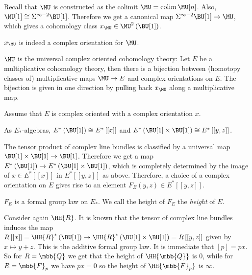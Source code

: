 \begin{example*}
	Recall that $\MU$ is constructed as the colimit $\MU = \colim \MU[n]$.
	Also, $\MU[1] \cong \Sigma^{\infty-2} \BU[1]$.
	Therefore we get a canonical map $\Sigma^{\infty-2} \BU[1] \to \MU$, which gives a cohomology class $x_{\MU} \in \MU^2\left(\BU[1]\right)$.
\end{example*}

\begin{proposition}
	$x_{\MU}$ is indeed a complex orientation for $\MU$.
\end{proposition}

\begin{theorem}
	$\MU$ is the universal complex oriented cohomology theory:
	Let $E$ be a multiplicative cohomology theory, then there is a bijection between (homotopy classes of) multiplicative maps $\MU \to E$ and complex orientations on $E$.
	The bijection is given in one direction by pulling back $x_{\MU}$ along a multiplicative map.
\end{theorem}

Assume that $E$ is complex oriented with a complex orientation $x$.

\begin{theorem}
	As $E_*$-algebras,
	$E^*\left(\BU[1]\right) \cong E^*\left[\left[x\right]\right]$
	and
	$E^*\left(\BU[1] \times \BU[1]\right) \cong E^*\left[\left[y,z\right]\right]$.
\end{theorem}

The tensor product of complex line bundles is classified by a universal map $\BU[1] \times \BU[1] \to \BU[1]$.
Therefore we get a map $E^*\left(\BU[1]\right) \to E^*\left(\BU[1] \times \BU[1]\right)$, which is completely determined by the image of $x \in E^*\left[\left[x\right]\right]$ in $E^*\left[\left[y,z\right]\right]$ as above.
Therefore, a choice of a complex orientation on $E$ gives rise to an element $F_E\left(y,z\right) \in E^*\left[\left[y,z\right]\right]$.

\begin{proposition}
	$F_E$ is a formal group law on $E_*$.
	We call the height of $F_E$ the \emph{height} of $E$.
\end{proposition}

\begin{example*}
	Consider again $\HH{R}$.
	It is known that the tensor of complex line bundles induces the map
	$
	R\left[\left[x\right]\right]
	= \HH{R}^*\left(\BU[1]\right)
	\to \HH{R}^*\left(\BU[1] \times \BU[1]\right)
	= R\left[\left[y,z\right]\right]
	$
	given by $x \mapsto y + z$.
	This is the additive formal group law.
	It is immediate that $\left[p\right] = p x$.
	So for $R = \mbb{Q}$ we get that the height of $\HH{\mbb{Q}}$ is 0, while for $R = \mbb{F}_p$ we have $p x = 0$ so the height of $\HH{\mbb{F}_p}$ is $\infty$.
\end{example*}

